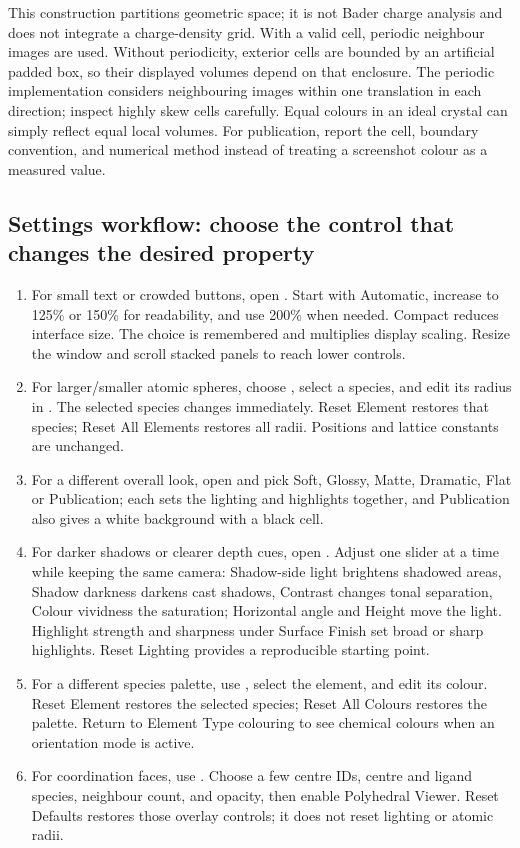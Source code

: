 This construction partitions geometric space; it is not Bader charge analysis and does not integrate a charge-density grid. With a valid cell, periodic neighbour images are used. Without periodicity, exterior cells are bounded by an artificial padded box, so their displayed volumes depend on that enclosure. The periodic implementation considers neighbouring images within one translation in each direction; inspect highly skew cells carefully. Equal colours in an ideal crystal can simply reflect equal local volumes. For publication, report the cell, boundary convention, and numerical method instead of treating a screenshot colour as a measured value.

\subsection{Settings workflow: choose the control that changes the desired property}
\begin{enumerate}
\item For small text or crowded buttons, open . Start with Automatic, increase to 125\% or 150\% for readability, and use 200\% when needed. Compact reduces interface size. The choice is remembered and multiplies display scaling. Resize the window and scroll stacked panels to reach lower controls.
\item For larger/smaller atomic spheres, choose , select a species, and edit its radius in \angstrom. The selected species changes immediately. Reset Element restores that species; Reset All Elements restores all radii. Positions and lattice constants are unchanged.
\item For a different overall look, open  and pick Soft, Glossy, Matte, Dramatic, Flat or Publication; each sets the lighting and highlights together, and Publication also gives a white background with a black cell.
\item For darker shadows or clearer depth cues, open . Adjust one slider at a time while keeping the same camera: Shadow-side light brightens shadowed areas, Shadow darkness darkens cast shadows, Contrast changes tonal separation, Colour vividness the saturation; Horizontal angle and Height move the light. Highlight strength and sharpness under Surface Finish set broad or sharp highlights. Reset Lighting provides a reproducible starting point.
\item For a different species palette, use , select the element, and edit its colour. Reset Element restores the selected species; Reset All Colours restores the palette. Return to Element Type colouring to see chemical colours when an orientation mode is active.
\item For coordination faces, use . Choose a few centre IDs, centre and ligand species, neighbour count, and opacity, then enable Polyhedral Viewer. Reset Defaults restores those overlay controls; it does not reset lighting or atomic radii.
\end{enumerate}
